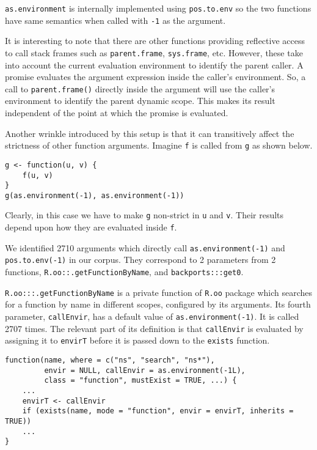\documentclass[review,nonacm,screen,acmsmall,anonymous=true]{acmart}
\newcommand{\code}[1]{\lstinline[style=R]|#1|\xspace}
\begin{document}
\code{as.environment} is internally implemented using \code{pos.to.env} so the
two functions have same semantics when called with \code{-1} as the argument.

It is interesting to note that there are other functions providing reflective
access to call stack frames such as \code{parent.frame}, \code{sys.frame}, etc.
However, these take into account the current evaluation environment to identify
the parent caller. A promise evaluates the argument expression inside the
caller's environment. So, a call to \code{parent.frame()} directly inside the
argument will use the caller's environment to identify the parent dynamic scope.
This makes its result independent of the point at which the promise is
evaluated.

Another wrinkle introduced by this setup is that it can transitively affect the
strictness of other function arguments. Imagine \code{f} is called from \code{g}
as shown below.

\begin{lstlisting}
g <- function(u, v) {
    f(u, v)
}
g(as.environment(-1), as.environment(-1))
\end{lstlisting}

Clearly, in this case we have to make \code{g} non-strict in \code{u} and
\code{v}. Their results depend upon how they are evaluated inside \code{f}.

We identified 2710 arguments which directly call \code{as.environment(-1)} and
\code{pos.to.env(-1)} in our corpus. They correspond to 2 parameters from 2
functions, \code{R.oo::.getFunctionByName}, and \code{backports:::get0}.

\code{R.oo:::.getFunctionByName} is a private function of \code{R.oo} package
which searches for a function by name in different scopes, configured by its
arguments. Its fourth parameter, \code{callEnvir}, has a default value of
\code{as.environment(-1)}. It is called 2707 times. The relevant part of its
definition is that \code{callEnvir} is evaluated by assigning it to
\code{envirT} before it is passed down to the \code{exists} function.

\begin{lstlisting}
function(name, where = c("ns", "search", "ns*"),
         envir = NULL, callEnvir = as.environment(-1L),
         class = "function", mustExist = TRUE, ...) {
    ...
    envirT <- callEnvir
    if (exists(name, mode = "function", envir = envirT, inherits = TRUE))
    ...
}
\end{lstlisting}
\end{document}
